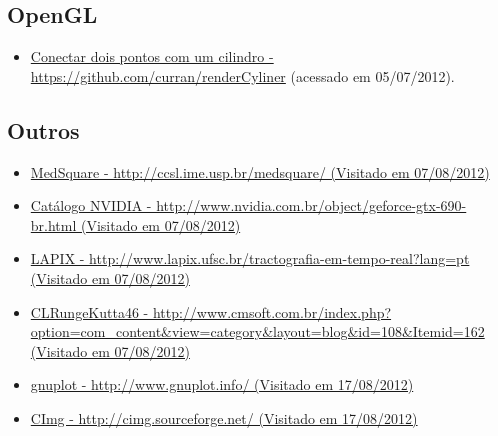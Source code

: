 \subsection{OpenGL}
\begin{itemize}
  \item \href{https://github.com/curran/renderCyliner}{Conectar dois pontos com um cilindro - https://github.com/curran/renderCyliner} (acessado em 05/07/2012).
\end{itemize}

\subsection{Outros}
\begin{itemize}
  \item \label{medsquare}\href{http://ccsl.ime.usp.br/medsquare/}{MedSquare - http://ccsl.ime.usp.br/medsquare/ (Visitado em 07/08/2012)}
  \item \label{gtx690}\href{http://www.nvidia.com.br/object/geforce-gtx-690-br.html}{Catálogo NVIDIA - http://www.nvidia.com.br/object/geforce-gtx-690-br.html (Visitado em 07/08/2012)}
  \item \label{lapix}\href{http://www.lapix.ufsc.br/tractografia-em-tempo-real?lang=pt}{LAPIX - http://www.lapix.ufsc.br/tractografia-em-tempo-real?lang=pt (Visitado em 07/08/2012)}
  \item \label{CLRungeKutta46}\href{http://www.cmsoft.com.br/index.php?option=com\_content\&view=category\&layout=blog\&id=108\&Itemid=162}{CLRungeKutta46 - http://www.cmsoft.com.br/index.php?option=com\_content\&view=category\&layout=blog\&id=108\&Itemid=162 (Visitado em 07/08/2012)}
  \item \label{gnuplot}\href{http://www.gnuplot.info/}{gnuplot - http://www.gnuplot.info/ (Visitado em 17/08/2012)}
  \item \label{CImg}\href{http://cimg.sourceforge.net/}{CImg - http://cimg.sourceforge.net/ (Visitado em 17/08/2012)}
\end{itemize}
